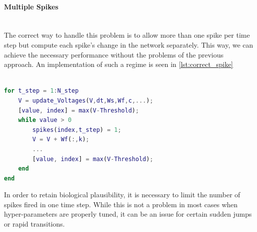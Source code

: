 \paragraph{Multiple Spikes}\label{p:multiple_spikes}\mbox{}\\
The correct way to handle this problem is to allow more than one spike per time step but compute each spike's change in the network separately. This way, we can achieve the necessary performance without the problems of the previous approach. An implementation of such a regime is seen in \cref{lst:correct_spike}

\begin{lstlisting}[language=Matlab, caption=Letting each neuron spike as many times as necessary while computing each spike's influence sequentially.,label=lst:correct_spike]

for t_step = 1:N_step
	V = update_Voltages(V,dt,Ws,Wf,c,...);
	[value, index] = max(V-Threshold);
	while value > 0
		spikes(index,t_step) = 1;
		V = V + Wf(:,k);
		...
		[value, index] = max(V-Threshold);
	end
end
\end{lstlisting}
In order to retain biological plausibility, it is necessary to limit the number of spikes fired in one time step. While this is not a problem in most cases when hyper-parameters are properly tuned, it can be an issue for certain sudden jumps or rapid transitions.\\

